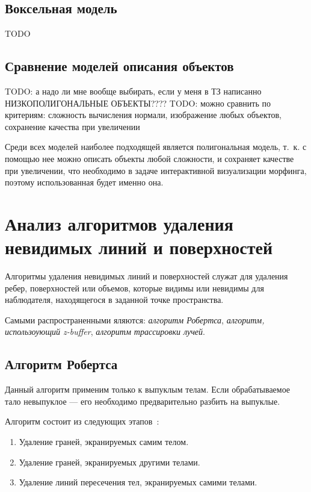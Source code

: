     \subsection{Воксельная модель}
    TODO
    
    \subsection{Сравнение моделей описания объектов}
    TODO: а надо ли мне вообще выбирать, если у меня в ТЗ написанно НИЗКОПОЛИГОНАЛЬНЫЕ ОБЪЕКТЫ????
    TODO: можно сравнить по критериям: сложность вычисления нормали, изображение любых объектов, сохранение качества при увеличении
    
    Среди всех моделей наиболее подходящей является полигональная модель, т.~к. с помощью нее можно описать объекты любой сложности, и сохраняет качестве при увеличении, что необходимо в задаче интерактивной визуализации морфинга,  поэтому использованная будет именно она.
    
    \section{Анализ алгоритмов удаления невидимых линий и поверхностей}
    
    Алгоритмы удаления невидимых линий и поверхностей служат для удаления ребер, поверхностей или объемов, которые видимы или невидимы для наблюдателя, находящегося в заданной точке пространства\cite{rogers}.
    
    Самыми распространенными яляются: \textit{алгоритм Робертса}, \textit{алгоритм, использоующий z-buffer}, \textit{алгоритм трассировки лучей}.
    
   \subsection{Алгоритм Робертса}
   
   Данный алгоритм применим только к выпуклым телам. Если обрабатываемое тало невыпуклое --- его необходимо предварительно разбить на выпуклые.
   
   Алгоритм состоит из следующих этапов~\cite{rogers}:
   \begin{enumerate}
   	\item[1)] Удаление граней, экранируемых самим телом.
   	\item[2)] Удаление граней, экранируемых другими телами.
   	\item[3)] Удаление линий пересечения тел, экранируемых самими телами.
   \end{enumerate}
   
